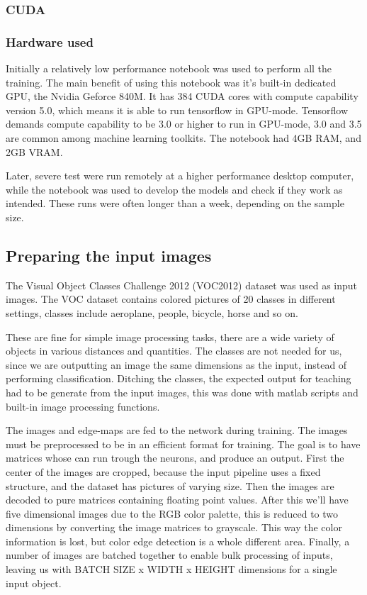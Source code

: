 \documentclass[a4paper]{article}
\begin{document}
\subsubsection{CUDA}
\subsubsection{Hardware used}
Initially a relatively low performance notebook was used to perform all the training. The main benefit of using this notebook was it's built-in dedicated GPU, the Nvidia Geforce 840M. It has 384 CUDA cores with compute capability version 5.0, which means it is able to run tensorflow in GPU-mode. Tensorflow demands compute capability to be 3.0 or higher to run in GPU-mode, 3.0 and 3.5 are common among machine learning toolkits. The notebook had 4GB RAM, and 2GB VRAM.\par
Later, severe test were run remotely at a higher performance desktop computer, while the notebook was used to develop the models and check if they work as intended. These runs were often longer than a week, depending on the sample size.
\subsection{Preparing the input images}
The Visual Object Classes Challenge 2012 (VOC2012) dataset was used as input images. The VOC dataset contains colored pictures of 20 classes in different settings, classes include aeroplane, people, bicycle, horse and so on.\par
These are fine for simple image processing tasks, there are a wide variety of objects in various distances and quantities. The classes are not needed for us, since we are outputting an image the same dimensions as the input, instead of performing classification. Ditching the classes, the expected output for teaching had to be generate from the input images, this was done with matlab scripts and built-in image processing functions.\par
The images and edge-maps are fed to the network during training. The images must be preprocessed to be in an efficient format for training. The goal is to have matrices whose can run trough the neurons, and produce an output. First the center of the images are cropped, because the input pipeline uses a fixed structure, and the dataset has pictures of varying size. Then the images are decoded to pure matrices containing floating point values. After this we'll have five dimensional images due to the RGB color palette, this is reduced to two dimensions by converting the image matrices to grayscale. This way the color information is lost, but color edge detection is a whole different area. Finally, a number of images are batched together to enable bulk processing of inputs, leaving us with BATCH SIZE x WIDTH x HEIGHT dimensions for a single input object.
\end{document}
